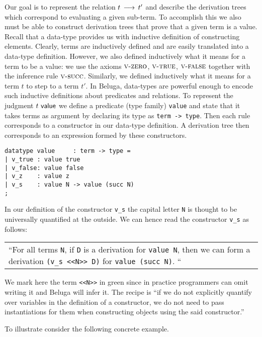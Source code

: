 Our goal is to represent the relation $t \mathrel{\,\longrightarrow\,} t'$ and describe the derivation
trees which correspond to evaluating a given sub-term. To accomplish this we
also must be able to construct derivation trees that prove that a given term is
a value. Recall that a data-type provides us with inductive definition of
constructing elements. Clearly, terms are inductively defined and are easily
translated into a data-type definition. However, we also defined inductively
what it means for a term to be a value: we use the axioms $\textsc{v-zero}$, $\textsc{v-true}$,
$\textsc{v-false}$ together with the inference rule $\textsc{v-succ}$. Similarly, we defined
inductively what it means for a term $t$ to step to a term $t'$. In Beluga,
data-types are powerful enough to encode such inductive definitions about
predicates and relations. To represent the judgment $t ~\textsf{value}$ we define a
predicate (type family) \lstinline!value! and state that it takes terms as
argument by declaring its type as \lstinline!term -> type!. Then each rule
corresponds to a constructor in our data-type definition. A derivation tree then
corresponds to an expression formed by these constructors.

\begin{lstlisting}
datatype value     : term -> type = 
| v_true : value true
| v_false: value false
| v_z    : value z
| v_s    : value N -> value (succ N)
;
\end{lstlisting}

In our definition of the constructor \lstinline!v_s! the capital letter
\lstinline!N! is thought to be universally quantified at the outside. We can
hence read the constructor \lstinline!v_s! as follows: 

\begin{center}
\begin{tabular}{p{12cm}}
``For all terms
\lstinline$N$, if \lstinline!D! is a derivation for \lstinline!value N!, then we can form a derivation
\lstinline!(v_s <<N>> D)! for \lstinline!value (succ N)!. ``
\end{tabular}  
\end{center}


We mark here the term \lstinline!<<N>>! in green since in practice programmers
can omit writing it and Beluga will infer it. The recipe is ``if we do not
explicitly quantify over variables in the definition of a constructor, we do not
need to pass instantiations for them when constructing objects using the said constructor.''

To illustrate consider the following concrete example.\\[1em]

